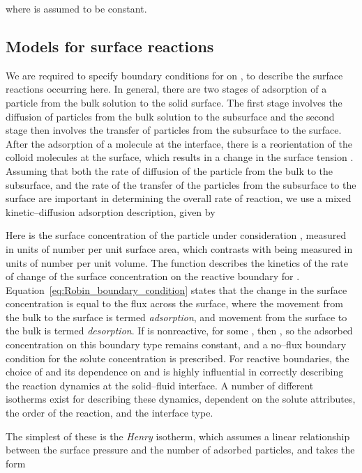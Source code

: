 \documentclass[preprint, 1p, authoryear]{elsarticle}
\begin{document}
where  is assumed to be constant.   

\subsection{Models for surface reactions}
We are required to specify boundary conditions for  on  , to describe the surface reactions occurring here.  In general, there are two stages of adsorption of a particle from the bulk solution to the solid surface. The first stage involves the diffusion of  particles from the bulk solution to the subsurface and the  second stage then involves the transfer of  particles  from the subsurface to the surface.  After the adsorption of a molecule at the interface, there is a reorientation of the colloid molecules at the surface, which results in a change in the surface tension \citep{birdi2008handbook}.  Assuming that both the rate of diffusion of the particle from the bulk to the subsurface, and the rate of the transfer of the particles from the subsurface to the surface are  important  in determining the overall rate of reaction, we use a mixed kinetic--diffusion adsorption description, given by

Here   is the surface concentration of the particle under consideration \citep{birdi2008handbook}, measured in units of number per unit surface area, which contrasts with  being  measured in units of number per unit volume.   
The function  describes the kinetics of the  rate of change of the surface concentration  on the  reactive boundary for   \citep{Danov2002Adsorption}. 
Equation~\eqref{eq:Robin_boundary_condition}  states that the change in the surface concentration is equal to the flux across the surface, where the movement from the bulk to the surface is  termed \emph{adsorption}, and movement from the surface to the bulk is  termed \emph{desorption}.
If  is nonreactive, for some , then , so the adsorbed concentration on this boundary type remains constant, and a no--flux boundary condition for the solute concentration  is prescribed. For reactive boundaries, the choice of  and its dependence on  and  is highly influential in correctly describing the reaction dynamics at the solid--fluid interface. A number of different isotherms exist for describing these dynamics, dependent on the solute attributes, the order of the reaction, and the interface type. 

The simplest of these is the \emph{Henry} isotherm, which assumes a linear relationship  between the surface pressure and the number of adsorbed particles, and takes the form
\end{document}
